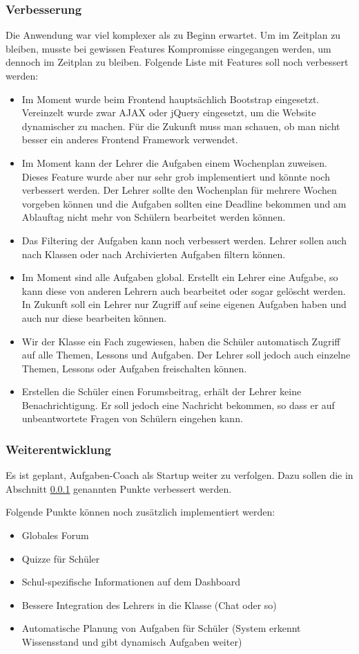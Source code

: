 \subsubsection{Verbesserung}
\label{verbesserung}
Die Anwendung war viel komplexer als zu Beginn erwartet. Um im Zeitplan zu bleiben, musste bei gewissen Features  Kompromisse eingegangen werden, um dennoch im Zeitplan zu bleiben. Folgende Liste mit Features soll noch verbessert werden:

\begin{itemize}
	\item Im Moment wurde beim Frontend hauptsächlich Bootstrap eingesetzt. Vereinzelt wurde zwar AJAX oder jQuery eingesetzt, um die Website dynamischer zu machen. Für die Zukunft muss man schauen, ob man nicht besser ein anderes Frontend Framework verwendet.
	\item Im Moment kann der Lehrer die Aufgaben einem Wochenplan zuweisen. Dieses Feature wurde aber nur sehr grob implementiert und könnte noch verbessert werden. Der Lehrer sollte den Wochenplan für mehrere Wochen vorgeben können und die Aufgaben sollten eine Deadline bekommen und am Ablauftag nicht mehr von Schülern bearbeitet werden können.
	\item Das Filtering der Aufgaben kann noch verbessert werden. Lehrer sollen auch nach Klassen oder nach Archivierten Aufgaben filtern können.
	\item Im Moment sind alle Aufgaben global. Erstellt ein Lehrer eine Aufgabe, so kann diese von anderen Lehrern auch bearbeitet oder sogar gelöscht werden. In Zukunft soll ein Lehrer nur Zugriff auf seine eigenen Aufgaben haben und auch nur diese bearbeiten können.
	\item Wir der Klasse ein Fach zugewiesen, haben die Schüler automatisch Zugriff auf alle Themen, Lessons und Aufgaben. Der Lehrer soll jedoch auch einzelne Themen, Lessons oder Aufgaben freischalten können.
	\item Erstellen die Schüler einen Forumsbeitrag, erhält der Lehrer keine Benachrichtigung. Er soll jedoch eine Nachricht bekommen, so dass er auf unbeantwortete Fragen von Schülern eingehen kann.
\end{itemize}



\subsubsection{Weiterentwicklung}
Es ist geplant, Aufgaben-Coach als Startup weiter zu verfolgen. Dazu sollen die in Abschnitt \ref{verbesserung} genannten Punkte verbessert werden.

Folgende Punkte können noch zusätzlich implementiert werden:
\begin{itemize}
	\item Globales Forum
	\item Quizze für Schüler
	\item Schul-spezifische Informationen auf dem Dashboard
	\item Bessere Integration des Lehrers in die Klasse (Chat oder so)
	\item Automatische Planung von Aufgaben für Schüler (System erkennt Wissensstand und gibt dynamisch Aufgaben weiter)
\end{itemize}
\newpage
